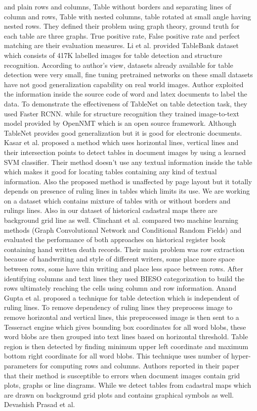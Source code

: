 and plain rows and columns, Table without borders and separating lines of column and rows, Table with nested columns, table rotated at small angle having nested rows. They defined their problem using graph theory, ground truth for each table are three graphs. True positive rate, False positive rate and perfect matching are their evaluation measures. Li et al. \cite{li2019tablebank} provided TableBank dataset which consists of 417K labelled images for table detection and structure recognition. According to author's view, datasets already available for table detection were very small, fine tuning pretrained networks on these small datasets have not good generalization capability on real world images. Author exploited the information inside the source code of word and latex documents to label the data. To demonstrate the effectiveness of TableNet on table detection task, they used Faster RCNN. while for structure recognition they trained image-to-text model provided by OpenNMT which is an open source framework. Although TableNet provides good generalization but it is good for electronic documents. Kasar et al. \cite{kasar2013learning} proposed a method which uses horizontal lines, vertical lines and their intersection points to detect tables in document images by using a learned SVM classifier. Their method doesn't use any textual information inside the table which makes it good for locating tables containing any kind of textual information. Also the proposed method is unaffected by page layout but it totally depends on presence of ruling lines in tables which limits its use. We are working on a dataset which contains mixture of tables with or without borders and rulings lines. Also in our dataset of historical cadastral maps there are background grid line as well. Clinchant et al. \cite{clinchant2018comparing} compared two machine learning methods (Graph Convolutional Network and  Conditional Random Fields) and evaluated the performance of both approaches on historical register book containing hand written death records. Their main problem was row extraction because of handwriting and style of different writers, some place more space between rows, some have thin writing and place less space between rows. After identifying columns and text lines they used BIESO categorization to build the rows ultimately reaching the cells using column and row information. Anand Gupta et al. \cite{gupta2019table} proposed a technique for table detection which is independent of ruling lines. To remove dependency of ruling lines they preprocess image to remove horizontal and vertical lines, this preprocessed image is then sent to a Tesseract engine which gives bounding box coordinates for all word blobs, these word blobs are then grouped into text lines based on horizontal threshold. Table region is then detected by finding minimum upper left coordinate and maximum bottom right coordinate for all word blobs. This technique uses number of hyper-parameters for computing rows and columns. Authors reported in their paper that their method is susceptible to errors when  document images contain grid plots, graphs or line diagrams. While we detect tables from cadastral maps which are drawn on background grid plots and contains graphical symbols as well. Devashish Prasad et al. 